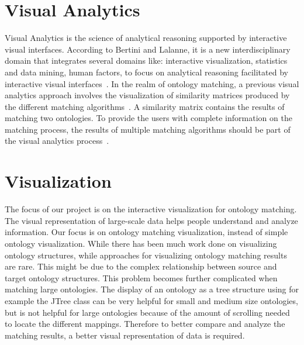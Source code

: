 
\section{Visual Analytics} %
\label{sub:analytics}
Visual Analytics is the science of analytical reasoning supported by interactive visual interfaces. According to Bertini and Lalanne, it is a new interdisciplinary domain that integrates several domains like: interactive visualization, statistics and data mining, human factors, to focus on analytical reasoning facilitated by interactive visual interfaces~\cite{Bertini2010}. In the realm of ontology matching, a previous visual analytics approach involves the visualization of similarity matrices produced by the different matching algorithms~\cite{cruz-icde-demo}. A similarity matrix contains the results of matching two ontologies. %
To provide the users with complete information on the matching process, the results of multiple matching algorithms should be part of the visual analytics process~\cite{cruz-icde-demo}. 


\section{Visualization} %
\label{sub:visualization}
The focus of our project is on the interactive visualization for ontology matching. The visual representation of large-scale data helps people understand and analyze information. %
Our focus is on ontology matching visualization, instead of simple ontology visualization. While there has been much work done on visualizing ontology structures, while approaches for visualizing ontology matching results are rare. This might be due to the complex relationship between source and target ontology structures. This problem becomes further complicated when matching large ontologies.  %
The display of an ontology as a tree structure using for example the JTree class can be very helpful for small and medium size ontologies, but is not helpful for large ontologies because of the amount of scrolling needed to locate the different mappings. Therefore to better compare and analyze the matching results, a better visual representation of data is required.





